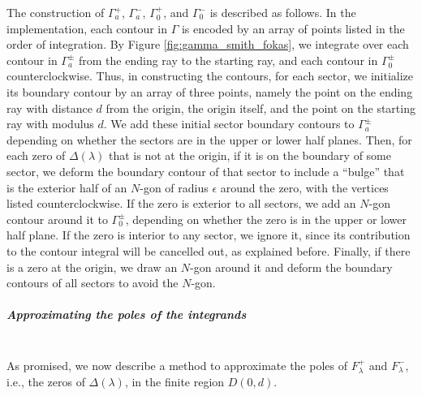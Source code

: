 \documentclass[12pt, oneside, a4paper]{article}
\begin{document}
The construction of $\Gamma_a^+$, $\Gamma_a^-$, $\Gamma_0^+$, and $\Gamma_0^-$ is described as follows. In the implementation, each contour in $\Gamma$ is encoded by an array of points listed in the order of integration. By Figure \ref{fig:gamma_smith_fokas}, we integrate over each contour in $\Gamma_a^\pm$ from the ending ray to the starting ray, and each contour in $\Gamma_0^\pm$ counterclockwise. Thus, in constructing the contours, for each sector, we initialize its boundary contour by an array of three points, namely the point on the ending ray with distance $d$ from the origin, the origin itself, and the point on the starting ray with modulus $d$. We add these initial sector boundary contours to $\Gamma_a^\pm$ depending on whether the sectors are in the upper or lower half planes. Then, for each zero of $\Delta(\lambda)$ that is not at the origin, if it is on the boundary of some sector, we deform the boundary contour of that sector to include a ``bulge'' that is the exterior half of an $N$-gon of radius $\epsilon$ around the zero, with the vertices listed counterclockwise. If the zero is exterior to all sectors, we add an $N$-gon contour around it to $\Gamma_0^{\pm}$, depending on whether the zero is in the upper or lower half plane. If the zero is interior to any sector, we ignore it, since its contribution to the contour integral will be cancelled out, as explained before. Finally, if there is a zero at the origin, we draw an $N$-gon around it and deform the boundary contours of all sectors to avoid the $N$-gon. 

\noindent\subparagraph{Approximating the poles of the integrands}\mbox{}\label{par:approximating_integrand_poles}\\
As promised, we now describe a method to approximate the poles of $F^+_\lambda$ and $F^-_\lambda$, i.e., the zeros of $\Delta(\lambda)$, in the finite region $D(0,d)$.
\end{document}

